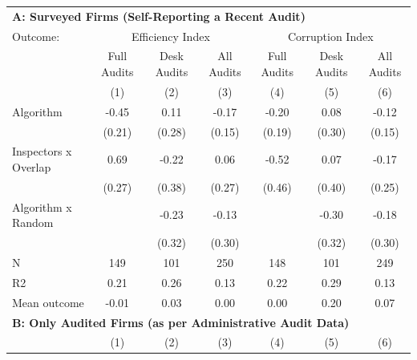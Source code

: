 \begin{tabular}{lccc|ccc} \toprule
\multicolumn{7}{l}{\textbf{A: Surveyed Firms (Self-Reporting a Recent Audit)}} \\ \multicolumn{1}{l}{Outcome:} & \multicolumn{3}{c}{Efficiency Index} & \multicolumn{3}{c}{Corruption Index} \\ \multicolumn{1}{l}{} & Full Audits & Desk Audits & All Audits & Full Audits & Desk Audits & All Audits \\ \multicolumn{1}{l}{} & (1) & (2) & (3) & (4) & (5) & (6) \\ \midrule
Algorithm   &       -0.45\sym{**} &        0.11         &       -0.17         &       -0.20         &        0.08         &       -0.12         \\
            &      (0.21)         &      (0.28)         &      (0.15)         &      (0.19)         &      (0.30)         &      (0.15)         \\
\addlinespace
Inspectors x Overlap&        0.69\sym{**} &       -0.22         &        0.06         &       -0.52         &        0.07         &       -0.17         \\
            &      (0.27)         &      (0.38)         &      (0.27)         &      (0.46)         &      (0.40)         &      (0.25)         \\
\addlinespace
Algorithm x Random&                     &       -0.23         &       -0.13         &                     &       -0.30         &       -0.18         \\
            &                     &      (0.32)         &      (0.30)         &                     &      (0.32)         &      (0.30)         \\
\midrule
N           &         149         &         101         &         250         &         148         &         101         &         249         \\
R2          &        0.21         &        0.26         &        0.13         &        0.22         &        0.29         &        0.13         \\
Mean outcome&       -0.01         &        0.03         &        0.00         &        0.00         &        0.20         &        0.07         \\

\midrule \multicolumn{7}{l}{\textbf{B: Only Audited Firms (as per Administrative Audit Data)}} \\ \multicolumn{1}{l}{} & (1) & (2) & (3) & (4) & (5) & (6) \\ \midrule


\end{tabular}

